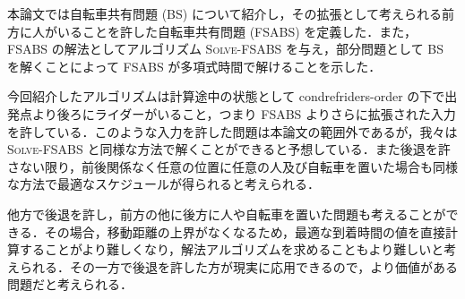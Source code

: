 本論文では自転車共有問題 (BS) について紹介し，その拡張として考えられる前方に人がいることを許した自転車共有問題 (FSABS) を定義した．また， FSABS の解法としてアルゴリズム \textsc{Solve-FSABS} を与え，部分問題として BS を解くことによって FSABS が多項式時間で解けることを示した．

今回紹介したアルゴリズムは計算途中の状態として condref{riders-order} の下で出発点より後ろにライダーがいること，つまり FSABS よりさらに拡張された入力を許している．このような入力を許した問題は本論文の範囲外であるが，我々は \textsc{Solve-FSABS} と同様な方法で解くことができると予想している．また後退を許さない限り，前後関係なく任意の位置に任意の人及び自転車を置いた場合も同様な方法で最適なスケジュールが得られると考えられる．

他方で後退を許し，前方の他に後方に人や自転車を置いた問題も考えることができる．その場合，移動距離の上界がなくなるため，最適な到着時間の値を直接計算することがより難しくなり，解法アルゴリズムを求めることもより難しいと考えられる．その一方で後退を許した方が現実に応用できるので，より価値がある問題だと考えられる．